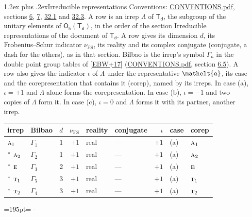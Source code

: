 \documentclass[10pt,a4paper]{article}
\makeatletter
\renewcommand\section{\@startsection{section}{1}{\z@}{-3ex plus -1ex minus -.2ex}%
  {1.2ex plus .2ex}{\normalfont\large\sffamily\bfseries\color{parttitle}}}
\newcommand{\needspace}[1]{\par\penalty-100\begingroup\dimen0=#1\relax\dimen2=\pagegoal
  \advance\dimen2-\pagetotal\ifdim\dimen0>\dimen2\relax\ifdim\dimen2>0pt\vfil\break\fi\fi
  \endgroup}
\numberwithin{equation}{section}
\newcommand{\eltfont}[1]{{\let\sigma\eltsigma\mathelt{#1}}}
\newcommand{\grp}[1]{\mathsf{#1}}
\newcommand{\irr}[1]{\text{\normalfont\scshape #1}}
\newcommand{\elt}[1]{\eltfont{#1}}
\newcommand{\fsind}{\nu_{\mathrm{FS}}}
\makeatother
\begin{document}
\section{Irreducible representations}\label{s:irreps}
Conventions: \href{../../CONVENTIONS.pdf}{CONVENTIONS.pdf}, sections \href{../../../rotation/CONVENTIONS.pdf\#conv.6}{6}, \href{../../../rotation/CONVENTIONS.pdf\#conv.7}{7}, \href{../../CONVENTIONS.pdf\#conv.32.1}{32.1} and \href{../../CONVENTIONS.pdf\#conv.32.3}{32.3}.
\leavevmode\label{n:irrep.Delta}A row is an irrep $\Lambda$ of $\grp{T_{d}}$, the subgroup of the unitary elements of $\grp{O_{h}}(\grp{T_{d}})$, in the order of the section Irreducible representations of the document of \href{../../../rotation/data/pdf/Td.pdf}{$\grp{T_{d}}$}. \label{n:index.dimension}\label{n:index.frobenius}\label{n:head.irrep}\label{n:head.reality}\label{n:head.conjugate}A row gives its dimension $d$, its Frobenius--Schur indicator $\fsind$, its reality and its complex conjugate (conjugate, a dash for the others), as in that section. \label{n:head.bilbao}\label{n:irrep.alias.gamma}Bilbao is the irrep's symbol $\Gamma_n$ in the double point group tables of [\href{../../../REFERENCES.pdf\#ref.EBW+17}{EBW+17}] (\href{../../CONVENTIONS.pdf}{CONVENTIONS.pdf}, section \href{../../../rotation/CONVENTIONS.pdf\#conv.6.5}{6.5}). \label{n:head.case.corep}\label{n:head.corep}A row also gives the indicator $\iota$ of $\Lambda$ under the representative $\elt{a}$, its case and the corepresentation that contains it (corep), named by its irreps. In case (a), $\iota = +1$ and $\Lambda$ alone forms the corepresentation. In case (b), $\iota = -1$ and two copies of $\Lambda$ form it. In case (c), $\iota = 0$ and $\Lambda$ forms it with its partner, another irrep.
\setlength{\emergencystretch}{2em}\par\setlength{\emergencystretch}{0pt}
{\small\renewcommand{\arraystretch}{1.25}\setlength{\tabcolsep}{4pt}\begin{longtable}{@{}llrrllrll@{}}\toprule
irrep & Bilbao & $d$ & $\fsind$ & reality & conjugate & $\iota$ & case & corep\\\midrule\endhead
\bottomrule\endfoot\endlastfoot
$\irr{a}_{1}$ & $\Gamma_{1}$ & 1 & $+1$ & real & --- & $+1$ & (a) & $\irr{a}_{1}$\\*
$\irr{a}_{2}$ & $\Gamma_{2}$ & 1 & $+1$ & real & --- & $+1$ & (a) & $\irr{a}_{2}$\\*
$\irr{e}$ & $\Gamma_{3}$ & 2 & $+1$ & real & --- & $+1$ & (a) & $\irr{e}$\\*
$\irr{t}_{1}$ & $\Gamma_{5}$ & 3 & $+1$ & real & --- & $+1$ & (a) & $\irr{t}_{1}$\\*
$\irr{t}_{2}$ & $\Gamma_{4}$ & 3 & $+1$ & real & --- & $+1$ & (a) & $\irr{t}_{2}$\\
\bottomrule\end{longtable}}
\needspace{195pt}
\end{document}

